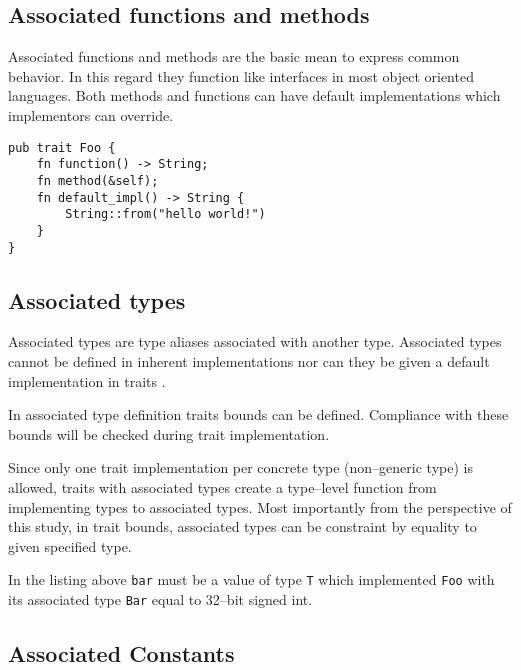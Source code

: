 \subsection{Associated functions and methods}

Associated functions and methods are the basic mean to express common behavior.
In this regard they function like interfaces in most object oriented languages.
Both methods and functions can have default implementations which implementors can override.

\begin{lstlisting}
pub trait Foo {
    fn function() -> String;
    fn method(&self);
    fn default_impl() -> String {
        String::from("hello world!")
    }
}

\end{lstlisting}

\subsection{Associated types}

Associated types are type aliases associated with another type. Associated types cannot be defined in inherent implementations nor can they be given a default implementation in traits \cite{rustrefernce}.



In associated type definition traits bounds can be defined. Compliance with these bounds will be checked during trait implementation.



Since only one trait implementation per concrete type (non--generic type) is allowed, traits with associated types create a type--level function from implementing types to associated types.
Most importantly from the perspective of this study, in trait bounds, associated types can be constraint by equality to given specified type.



In the listing above \texttt{bar} must be a value of type \texttt{T} which implemented \texttt{Foo} with its associated type \texttt{Bar} equal to 32--bit signed int.

\subsection{Associated Constants}


